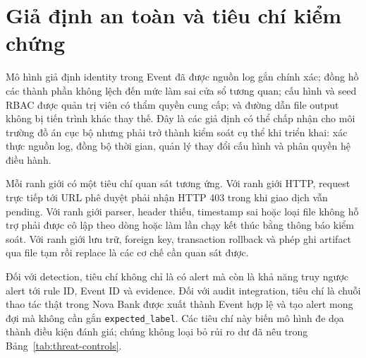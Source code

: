 \section{Giả định an toàn và tiêu chí kiểm chứng}

Mô hình giả định identity trong Event đã được nguồn log gắn chính xác; đồng hồ
các thành phần không lệch đến mức làm sai cửa sổ tương quan; cấu hình và seed
RBAC được quản trị viên có thẩm quyền cung cấp; và đường dẫn file output không
bị tiến trình khác thay thế. Đây là các giả định có thể chấp nhận cho môi trường
đồ án cục bộ nhưng phải trở thành kiểm soát cụ thể khi triển khai: xác thực nguồn
log, đồng bộ thời gian, quản lý thay đổi cấu hình và phân quyền hệ điều hành.

Mỗi ranh giới có một tiêu chí quan sát tương ứng. Với ranh giới HTTP, request
trực tiếp tới URL phê duyệt phải nhận HTTP 403 trong khi giao dịch vẫn pending.
Với ranh giới parser, header thiếu, timestamp sai hoặc loại file không hỗ trợ
phải được cô lập theo dòng hoặc làm lần chạy kết thúc bằng thông báo kiểm soát.
Với ranh giới lưu trữ, foreign key, transaction rollback và phép ghi artifact
qua file tạm rồi replace là các cơ chế cần quan sát được.

Đối với detection, tiêu chí không chỉ là có alert mà còn là khả năng truy ngược
alert tới rule ID, Event ID và evidence. Đối với audit integration, tiêu chí là
chuỗi thao tác thật trong Nova Bank được xuất thành Event hợp lệ và tạo alert
mong đợi mà không cần gắn \texttt{expected\_label}. Các tiêu chí này biến mô
hình đe dọa thành điều kiện đánh giá; chúng không loại bỏ rủi ro dư đã nêu trong
Bảng~\ref{tab:threat-controls}.
